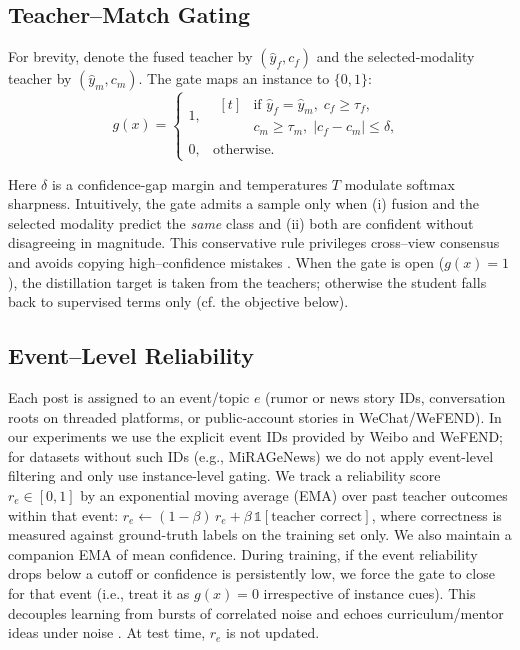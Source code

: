 \subsection{Teacher–Match Gating}
For brevity, denote the fused teacher by $(\hat{y}_f,c_f)$
and the selected-modality teacher by $(\hat{y}_m,c_m)$.
The gate maps an instance to $\{0,1\}$:
\begin{equation}
g(x)=
\begin{cases}
1, &
\begin{aligned}[t]
&\text{if } \hat{y}_f=\hat{y}_m,\; c_f\ge\tau_f,\\
& c_m\ge\tau_m,\; \lvert c_f-c_m\rvert\le\delta,
\end{aligned}
\\[2pt]
0, & \text{otherwise.}
\end{cases}
\end{equation}

Here $\delta$ is a confidence-gap margin and temperatures $T$ modulate softmax sharpness. Intuitively, the gate admits a sample only when (i) fusion and the selected modality predict the \emph{same} class and (ii) both are confident without disagreeing in magnitude. This conservative rule privileges cross–view consensus and avoids copying high–confidence mistakes \citep{BlumMitchell1998}. When the gate is open (\(g(x)=1\)), the distillation target is taken from the teachers; otherwise the student falls back to supervised terms only (cf. the objective below).

\subsection{Event–Level Reliability}
Each post is assigned to an event/topic \(e\) (rumor or news story IDs, conversation roots on threaded platforms, or public-account stories in WeChat/WeFEND). In our experiments we use the explicit event IDs provided by Weibo and WeFEND; for datasets without such IDs (e.g., MiRAGeNews) we do not apply event-level filtering and only use instance-level gating. We track a reliability score \(r_e\in[0,1]\) by an exponential moving average (EMA) over past teacher outcomes within that event: \(r_e\leftarrow (1-\beta)\, r_e + \beta\, \mathbb{1}[\text{teacher correct}]\), where correctness is measured against ground-truth labels on the training set only. We also maintain a companion EMA of mean confidence. During training, if the event reliability drops below a cutoff or confidence is persistently low, we force the gate to close for that event (i.e., treat it as \(g(x)=0\) irrespective of instance cues). This decouples learning from bursts of correlated noise and echoes curriculum/mentor ideas under noise \citep{MentorNet2018,Han2018Coteaching}. At test time, $r_e$ is not updated.

